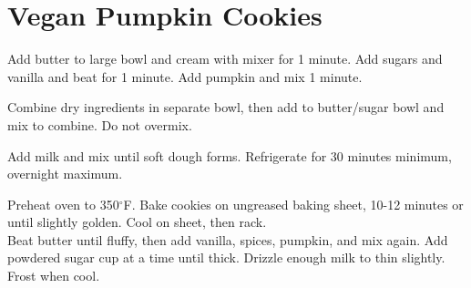 \section{Vegan Pumpkin Cookies}
\begin{recipe}



	Add butter to large bowl and cream with mixer for 1 minute. Add sugars and vanilla and beat for 1 minute. Add pumpkin and mix 1 minute.

	Combine dry ingredients in separate bowl, then add to butter/sugar bowl and mix to combine. Do not overmix.

	Add milk and mix until soft dough forms. Refrigerate for 30 minutes minimum, overnight maximum.

	Preheat oven to 350$^{\circ}$F. Bake cookies on ungreased baking sheet, 10-12 minutes or until slightly golden. Cool on sheet, then rack.\\

	Beat butter until fluffy, then add vanilla, spices, pumpkin, and mix again. Add powdered sugar  cup at a time until thick. Drizzle enough milk to thin slightly. Frost when cool.


\end{recipe}
